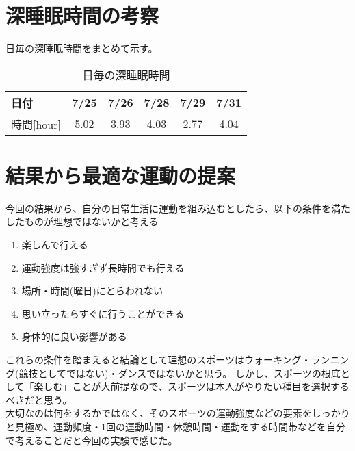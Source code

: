 \documentclass[a4paper,12pt, uplatex, fleqn]{jsarticle}
\begin{document}
\section{深睡眠時間の考察}
日毎の深睡眠時間をまとめて示す。
    \begin{table}[htbp]
        \begin{center}
        \caption{日毎の深睡眠時間}
            \begin{tabular}{l|ccccc}
                日付 & 7/25 & 7/26 & 7/28 & 7/29 & 7/31 \\ \hline
                時間[hour] & 5.02 & 3.93 & 4.03 & 2.77 & 4.04 \\
            \end{tabular}
        \end{center}
    \end{table}

\section{結果から最適な運動の提案}
今回の結果から、自分の日常生活に運動を組み込むとしたら、以下の条件を満たしたものが理想ではないかと考える
\begin{enumerate}
    \item 楽しんで行える
    \item 運動強度は強すぎず長時間でも行える
    \item 場所・時間(曜日)にとらわれない
    \item 思い立ったらすぐに行うことができる
    \item 身体的に良い影響がある
\end{enumerate}
これらの条件を踏まえると結論として理想のスポーツはウォーキング・ランニング(競技としてではない)・ダンスではないかと思う。
しかし、スポーツの根底として「楽しむ」ことが大前提なので、スポーツは本人がやりたい種目を選択するべきだと思う。\\
大切なのは何をするかではなく、そのスポーツの運動強度などの要素をしっかりと見極め、運動頻度・1回の運動時間・休憩時間・運動をする時間帯などを自分で考えることだと今回の実験で感じた。
\end{document}
